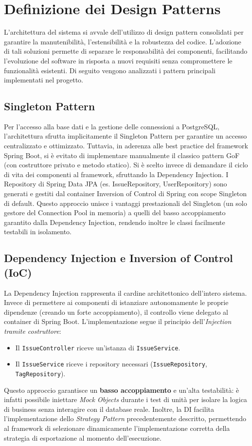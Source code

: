 \chapter{Definizione dei Design Patterns}

L'architettura del sistema si avvale dell'utilizzo di design pattern consolidati per garantire la manutenibilità, l'estensibilità e la robustezza del codice. L'adozione di tali soluzioni permette di separare le responsabilità dei componenti, facilitando l'evoluzione del software in risposta a nuovi requisiti senza compromettere le funzionalità esistenti. Di seguito vengono analizzati i pattern principali implementati nel progetto.

\section{Singleton Pattern}
    Per l'accesso alla base dati e la gestione delle connessioni a PostgreSQL, l'architettura sfrutta implicitamente il Singleton Pattern per garantire un accesso centralizzato e ottimizzato. Tuttavia, in aderenza alle best practice del framework Spring Boot, si è evitato di implementare manualmente il classico pattern GoF (con costruttore privato e metodo statico). Si è scelto invece di demandare il ciclo di vita dei componenti al framework, sfruttando la Dependency Injection. I Repository di Spring Data JPA (es. IssueRepository, UserRepository) sono generati e gestiti dal container Inversion of Control di Spring con scope Singleton di default. Questo approccio unisce i vantaggi prestazionali del Singleton (un solo gestore del Connection Pool in memoria) a quelli del basso accoppiamento garantito dalla Dependency Injection, rendendo inoltre le classi facilmente testabili in isolamento.

\section{Dependency Injection e Inversion of Control (IoC)}
    La Dependency Injection rappresenta il cardine architettonico dell'intero sistema. Invece di permettere ai componenti di istanziare autonomamente le proprie dipendenze (creando un forte accoppiamento), il controllo viene delegato al container di Spring Boot.
    L'implementazione segue il principio dell'\textit{Injection tramite costruttore}:
    \begin{itemize}
        \item Il \texttt{IssueController} riceve un'istanza di \texttt{IssueService}.
        \item Il \texttt{IssueService} riceve i repository necessari (\texttt{IssueRepository}, \texttt{TagRepository}).
    \end{itemize}
    Questo approccio garantisce un \textbf{basso accoppiamento} e un'alta testabilità: è infatti possibile iniettare \textit{Mock Objects} durante i test di unità per isolare la logica di business senza interagire con il database reale. Inoltre, la DI facilita l'implementazione dello \textit{Strategy Pattern} precedentemente descritto, permettendo al framework di selezionare dinamicamente l'implementazione corretta della strategia di esportazione al momento dell'esecuzione.


